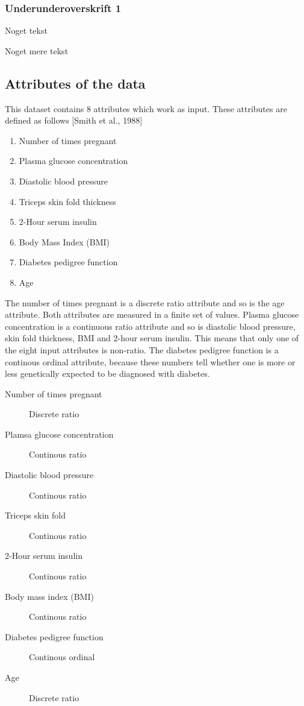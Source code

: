 \subsubsection{Underunderoverskrift 1}

Noget tekst

Noget mere tekst


\subsection{Attributes of the data}
This dataset contains 8 attributes which work as input. These attributes are defined as follows
[Smith et al., 1988]
\begin{enumerate}
\item Number of times pregnant
\item Plasma glucose concentration
\item Diastolic blood pressure
\item Triceps skin fold thickness
\item 2-Hour serum insulin
\item Body Mass Index (BMI)
\item Diabetes pedigree function
\item Age
\end{enumerate}

The number of times pregnant is a discrete ratio attribute and so is
the age attribute. Both attributes are measured in a finite set of values.
Plasma glucose concentration is a continuous ratio attribute
and so is diastolic blood pressure, skin fold thickness, BMI and 2-hour serum
insulin. This means that only one of the eight input attributes is non-ratio.
The diabetes pedigree function is a continous ordinal attribute, because these
numbers tell whether one is more or less genetically expected to be diagnosed
with diabetes.
\bigskip

\begin{description}
\item [Number of times pregnant] Discrete ratio
\item [Plamsa glucose concentration] Continous ratio
\item [Diastolic blood pressure] Continous ratio
\item [Triceps skin fold] Continous ratio
\item [2-Hour serum insulin] Continous ratio
\item [Body mass index (BMI)] Continous ratio
\item [Diabetes pedigree function] Continous ordinal
\item [Age] Discrete ratio
\end{description}


